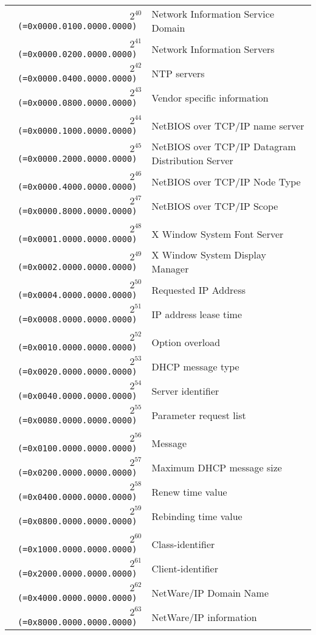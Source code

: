 \documentclass[documentation]{subfiles}
\begin{document}
\begin{small}
\begin{longtable}{>{\tt}rl}
        $2^{40}$ (=0x0000.0100.0000.0000) & Network Information Service Domain \\
        $2^{41}$ (=0x0000.0200.0000.0000) & Network Information Servers \\
        $2^{42}$ (=0x0000.0400.0000.0000) & NTP servers \\
        $2^{43}$ (=0x0000.0800.0000.0000) & Vendor specific information \\
        \\
        $2^{44}$ (=0x0000.1000.0000.0000) & NetBIOS over TCP/IP name server \\
        $2^{45}$ (=0x0000.2000.0000.0000) & NetBIOS over TCP/IP Datagram Distribution Server \\
        $2^{46}$ (=0x0000.4000.0000.0000) & NetBIOS over TCP/IP Node Type \\
        $2^{47}$ (=0x0000.8000.0000.0000) & NetBIOS over TCP/IP Scope \\
        \\
        $2^{48}$ (=0x0001.0000.0000.0000) & X Window System Font Server \\
        $2^{49}$ (=0x0002.0000.0000.0000) & X Window System Display Manager \\
        $2^{50}$ (=0x0004.0000.0000.0000) & Requested IP Address \\
        $2^{51}$ (=0x0008.0000.0000.0000) & IP address lease time \\
        \\
        $2^{52}$ (=0x0010.0000.0000.0000) & Option overload \\
        $2^{53}$ (=0x0020.0000.0000.0000) & DHCP message type \\
        $2^{54}$ (=0x0040.0000.0000.0000) & Server identifier \\
        $2^{55}$ (=0x0080.0000.0000.0000) & Parameter request list\\
        \\
        $2^{56}$ (=0x0100.0000.0000.0000) & Message \\
        $2^{57}$ (=0x0200.0000.0000.0000) & Maximum DHCP message size \\
        $2^{58}$ (=0x0400.0000.0000.0000) & Renew time value \\
        $2^{59}$ (=0x0800.0000.0000.0000) & Rebinding time value \\
        \\
        $2^{60}$ (=0x1000.0000.0000.0000) & Class-identifier \\
        $2^{61}$ (=0x2000.0000.0000.0000) & Client-identifier \\
        $2^{62}$ (=0x4000.0000.0000.0000) & NetWare/IP Domain Name \\
        $2^{63}$ (=0x8000.0000.0000.0000) & NetWare/IP information \\
        \bottomrule
    \end{longtable}
\end{small}
\end{document}
